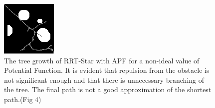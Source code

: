 \documentclass[runningheads]{llncs}
\begin{document}
\begin{figure}
\begin{center}
\includegraphics[scale=1.5]{tree.png}
    \caption{ The tree growth of RRT-Star with APF for a non-ideal value of Potential Function. It is evident that repulsion from the obstacle is not significant enough and that there is unnecessary branching of the tree. The final path is not a good approximation of the shortest path.(Fig 4)} \label{fig1}
\end{center}
\end{figure}
\end{document}
